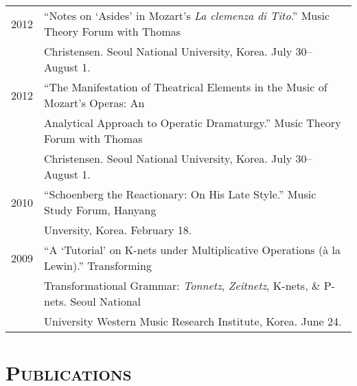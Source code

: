 \documentclass[letter,11pt,draft]{article}
\begin{document}
  \hspace*{-0.25cm}
  \begin{tabular}{p{2.5cm} p{12.5cm}}
  2012 & “Notes on ‘Asides’ in Mozart’s \textit{La clemenza di Tito}.” Music Theory Forum with Thomas\\
  & Christensen. Seoul National University, Korea. July 30–August 1.\\[2mm]

  2012 & “The Manifestation of Theatrical Elements in the Music of Mozart’s Operas: An\\
  & Analytical Approach to Operatic Dramaturgy.” Music Theory Forum with Thomas\\
  & Christensen. Seoul National University, Korea. July 30–August 1.\\[2mm]

  2010 & “Schoenberg the Reactionary: On His Late Style.” Music Study Forum, Hanyang\\
  & Unversity, Korea. February 18.\\[2mm]

  2009 & “A ‘Tutorial’ on K-nets under Multiplicative Operations (à la Lewin).” Transforming\\
  & Transformational Grammar: \textit{Tonnetz}, \textit{Zeitnetz}, K-nets, \& P-nets. Seoul National\\
  & University Western Music Research Institute, Korea. June 24.

  \end{tabular}
  
  \vspace{2.5mm}
  
  \section*{\textsc{Publications}}
  
\end{document}
